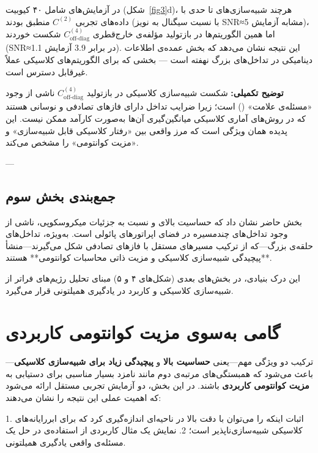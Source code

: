 در آزمایش‌های شامل ۴۰ کیوبیت (شکل~\ref{fig3}d)، هرچند شبیه‌سازی‌های  تا حدی با داده‌های تجربی \(C^{(2)}\) منطبق بودند (با نسبت سیگنال به نویز SNR≈5 مشابه آزمایش)، اما همین الگوریتم‌ها در بازتولید مؤلفه‌ی خارج‌قطری \(C^{(4)}_{\text{off-diag}}\) شکست خوردند (SNR≈1.1 در برابر 3.9 آزمایش).  
این نتیجه نشان می‌دهد که بخش عمده‌ی اطلاعات دینامیکی در تداخل‌های بزرگ نهفته است — بخشی که برای الگوریتم‌های کلاسیکی عملاً غیرقابل دسترس است.

\textbf{توضیح تکمیلی:}  
شکست شبیه‌سازی کلاسیکی در بازتولید \(C^{(4)}_{\text{off-diag}}\) ناشی از وجود «مسئله‌ی علامت» () است؛ زیرا ضرایب تداخل دارای فازهای تصادفی و نوسانی هستند که در روش‌های آماری کلاسیکی میانگین‌گیری آن‌ها به‌صورت کارآمد ممکن نیست.  
این پدیده همان ویژگی است که مرز واقعی بین «رفتار کلاسیکی قابل شبیه‌سازی» و «مزیت کوانتومی» را مشخص می‌کند.

---

\subsection{جمع‌بندی بخش سوم}

بخش حاضر نشان داد که حساسیت بالای  و  نسبت به جزئیات میکروسکوپی، ناشی از وجود تداخل‌های چندمسیره در فضای اپراتورهای پائولی است.  
به‌ویژه، تداخل‌های حلقه‌ی بزرگ—که از ترکیب مسیرهای مستقل با فازهای تصادفی شکل می‌گیرند—منشأ **پیچیدگی شبیه‌سازی کلاسیکی و مزیت ذاتی محاسبات کوانتومی** هستند.

این درک بنیادی، در بخش‌های بعدی (شکل‌های ۴ و ۵) مبنای تحلیل رژیم‌های فراتر از شبیه‌سازی کلاسیکی و کاربرد  در یادگیری همیلتونی قرار می‌گیرد.

\section{گامی به‌سوی مزیت کوانتومی کاربردی}
\label{sec:advantage}

ترکیب دو ویژگی مهم—یعنی \textbf{حساسیت بالا} و \textbf{پیچیدگی زیاد برای شبیه‌سازی کلاسیکی}—باعث می‌شود که همبستگی‌های مرتبه‌ی دوم مانند  نامزد بسیار مناسبی برای دستیابی به \textbf{مزیت کوانتومی کاربردی} باشند.  
در این بخش، دو آزمایش تجربی مستقل ارائه می‌شود که اهمیت عملی این نتیجه را نشان می‌دهند:

1. اثبات اینکه  را می‌توان با دقت بالا در ناحیه‌ای اندازه‌گیری کرد که برای ابررایانه‌های کلاسیکی شبیه‌سازی‌ناپذیر است؛  
2. نمایش یک مثال کاربردی از استفاده‌ی  در حل یک مسئله‌ی واقعی یادگیری همیلتونی.

